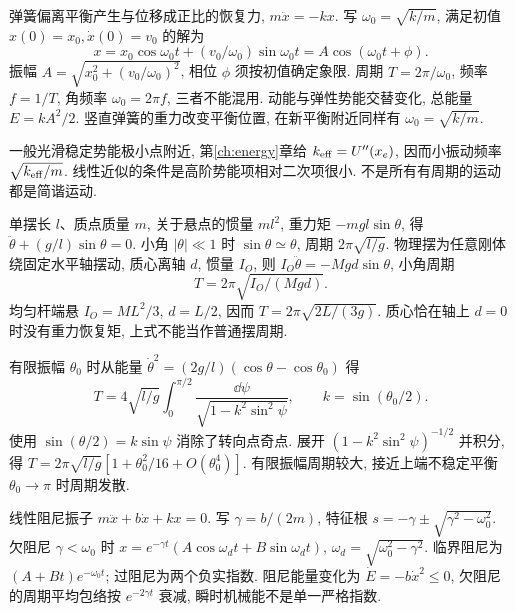 \label{ch:osc}
弹簧偏离平衡产生与位移成正比的恢复力, $m\ddot x=-kx$. 写 $\omega_0=\sqrt{k/m}$, 满足初值 $x(0)=x_0,\dot x(0)=v_0$ 的解为
\begin{equation}
x=x_0\cos\omega_0t+(v_0/\omega_0)\sin\omega_0t
=A\cos(\omega_0t+\phi).
\end{equation}
振幅 $A=\sqrt{x_0^2+(v_0/\omega_0)^2}$, 相位 $\phi$ 须按初值确定象限. 周期 $T=2\pi/\omega_0$, 频率 $f=1/T$, 角频率 $\omega_0=2\pi f$, 三者不能混用. 动能与弹性势能交替变化, 总能量 $E=kA^2/2$. 竖直弹簧的重力改变平衡位置, 在新平衡附近同样有 $\omega_0=\sqrt{k/m}$.

一般光滑稳定势能极小点附近, 第\ref{ch:energy}章给 $k_{\rm eff}=U''(x_e)$, 因而小振动频率 $\sqrt{k_{\rm eff}/m}$. 线性近似的条件是高阶势能项相对二次项很小. 不是所有有周期的运动都是简谐运动.

单摆长 $l$、质点质量 $m$, 关于悬点的惯量 $ml^2$, 重力矩 $-mgl\sin\theta$, 得 $\ddot\theta+(g/l)\sin\theta=0$. 小角 $|\theta|\ll1$ 时 $\sin\theta\simeq\theta$, 周期 $2\pi\sqrt{l/g}$. 物理摆为任意刚体绕固定水平轴摆动, 质心离轴 $d$, 惯量 $I_O$, 则 $I_O\ddot\theta=-Mgd\sin\theta$, 小角周期
\begin{equation}
T=2\pi\sqrt{I_O/(Mgd)}.
\end{equation}
均匀杆端悬 $I_O=ML^2/3$, $d=L/2$, 因而 $T=2\pi\sqrt{2L/(3g)}$. 质心恰在轴上 $d=0$ 时没有重力恢复矩, 上式不能当作普通摆周期.

有限振幅 $\theta_0$ 时从能量 $\dot\theta^2=(2g/l)(\cos\theta-\cos\theta_0)$ 得
\begin{equation}
T=4\sqrt{l/g}\int_0^{\pi/2}
\frac{\dd\psi}{\sqrt{1-k^2\sin^2\psi}},\qquad k=\sin(\theta_0/2).
\end{equation}
使用 $\sin(\theta/2)=k\sin\psi$ 消除了转向点奇点. 展开 $(1-k^2\sin^2\psi)^{-1/2}$ 并积分, 得 $T=2\pi\sqrt{l/g}[1+\theta_0^2/16+O(\theta_0^4)]$. 有限振幅周期较大, 接近上端不稳定平衡 $\theta_0\to\pi$ 时周期发散.

线性阻尼振子 $m\ddot x+b\dot x+kx=0$. 写 $\gamma=b/(2m)$, 特征根 $s=-\gamma\pm\sqrt{\gamma^2-\omega_0^2}$. 欠阻尼 $\gamma<\omega_0$ 时 $x=e^{-\gamma t}(A\cos\omega_dt+B\sin\omega_dt)$, $\omega_d=\sqrt{\omega_0^2-\gamma^2}$. 临界阻尼为 $(A+Bt)e^{-\omega_0t}$; 过阻尼为两个负实指数. 阻尼能量变化为 $\dot E=-b\dot x^2\le0$, 欠阻尼的周期平均包络按 $e^{-2\gamma t}$ 衰减, 瞬时机械能不是单一严格指数.

